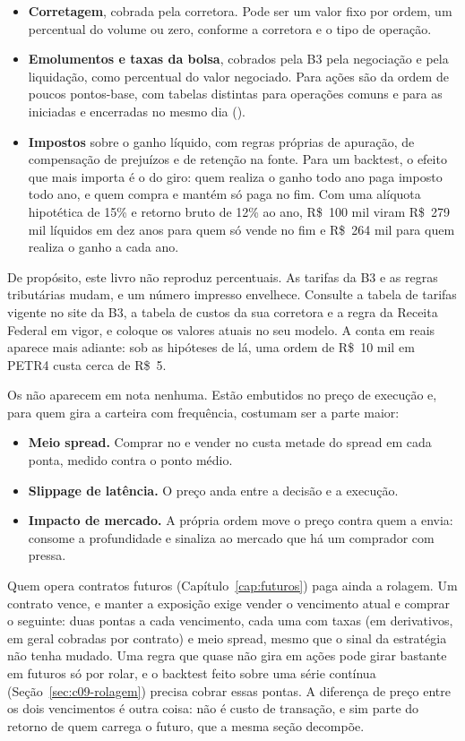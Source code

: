 \begin{itemize}
  \item \textbf{Corretagem}, cobrada pela corretora. Pode ser um valor fixo por ordem, um percentual do volume ou zero, conforme a corretora e o tipo de operação.
  \item \textbf{Emolumentos e taxas da bolsa}, cobrados pela B3 pela negociação e pela liquidação, como percentual do valor negociado. Para ações são da ordem de poucos pontos-base, com tabelas distintas para operações comuns e para as iniciadas e encerradas no mesmo dia ().
  \item \textbf{Impostos} sobre o ganho líquido, com regras próprias de apuração, de compensação de prejuízos e de retenção na fonte. Para um backtest, o efeito que mais importa é o do giro: quem realiza o ganho todo ano paga imposto todo ano, e quem compra e mantém só paga no fim. Com uma alíquota hipotética de 15\% e retorno bruto de 12\% ao ano, R\$~100 mil viram R\$~279 mil líquidos em dez anos para quem só vende no fim e R\$~264 mil para quem realiza o ganho a cada ano.
\end{itemize}

De propósito, este livro não reproduz percentuais. As tarifas da B3 e as regras tributárias mudam, e um número impresso envelhece. Consulte a tabela de tarifas vigente no site da B3, a tabela de custos da sua corretora e a regra da Receita Federal em vigor, e coloque os valores atuais no seu modelo. A conta em reais aparece mais adiante: sob as hipóteses de lá, uma ordem de R\$~10 mil em PETR4 custa cerca de R\$~5.

Os  não aparecem em nota nenhuma. Estão embutidos no preço de execução e, para quem gira a carteira com frequência, costumam ser a parte maior:

\begin{itemize}
  \item \textbf{Meio spread.} Comprar no  e vender no  custa metade do spread em cada ponta, medido contra o ponto médio.
  \item \textbf{Slippage de latência.} O preço anda entre a decisão e a execução.
  \item \textbf{Impacto de mercado.} A própria ordem move o preço contra quem a envia: consome a profundidade e sinaliza ao mercado que há um comprador com pressa.
\end{itemize}

Quem opera contratos futuros (Capítulo~\ref{cap:futuros}) paga ainda a rolagem. Um contrato vence, e manter a exposição exige vender o vencimento atual e comprar o seguinte: duas pontas a cada vencimento, cada uma com taxas (em derivativos, em geral cobradas por contrato) e meio spread, mesmo que o sinal da estratégia não tenha mudado. Uma regra que quase não gira em ações pode girar bastante em futuros só por rolar, e o backtest feito sobre uma série contínua (Seção~\ref{sec:c09-rolagem}) precisa cobrar essas pontas. A diferença de preço entre os dois vencimentos é outra coisa: não é custo de transação, e sim parte do retorno de quem carrega o futuro, que a mesma seção decompõe.

